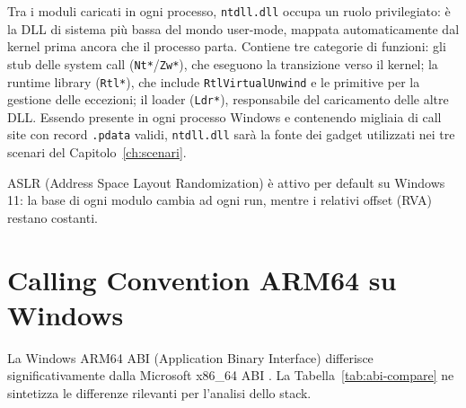 Tra i moduli caricati in ogni processo, \texttt{ntdll.dll} occupa un ruolo
privilegiato: è la DLL di sistema più bassa del mondo user-mode, mappata
automaticamente dal kernel prima ancora che il processo parta. Contiene tre
categorie di funzioni: gli stub delle system call (\texttt{Nt*}/\texttt{Zw*}),
che eseguono la transizione verso il kernel; la runtime library (\texttt{Rtl*}),
che include \texttt{RtlVirtualUnwind} e le primitive per la gestione delle
eccezioni; il loader (\texttt{Ldr*}), responsabile del caricamento delle altre
DLL. Essendo presente in ogni processo Windows e contenendo migliaia di call
site con record \texttt{.pdata} validi, \texttt{ntdll.dll} sarà la fonte dei
gadget utilizzati nei tre scenari del Capitolo~\ref{ch:scenari}.

ASLR (Address Space Layout Randomization) è attivo per default su Windows 11:
la base di ogni modulo cambia ad ogni run, mentre i relativi offset (RVA)
restano costanti.


\section{Calling Convention ARM64 su Windows}

La Windows ARM64 ABI (Application Binary Interface) differisce significativamente
dalla Microsoft x86\_64 ABI \cite{msarm64abi}. La Tabella~\ref{tab:abi-compare}
ne sintetizza le differenze rilevanti per l'analisi dello stack.

